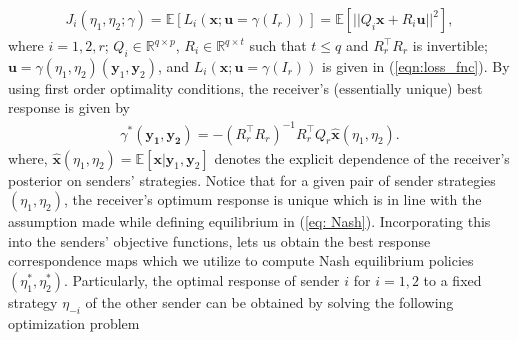 \documentclass[12pt,journal,onecolumn]{IEEEtran}
\begin{document}
\begin{align}\label{eqn:quad_cost}   J_i(\eta_1,\eta_2;\gamma)=\mathbb{E}[L_i(\boldsymbol{x};\boldsymbol{u}=\gamma(I_r))]=\mathbb{E}[||Q_i\boldsymbol{x}+R_i\boldsymbol{u}||^2],
\end{align}
where $i=1,2,r$; $Q_i\in\mathbb{R}^{q\times p}$, $R_i\in\mathbb{R}^{q\times t}$ such that $t\leq q$ and $R_r^\top R_r$ is invertible; $\boldsymbol{u}=\gamma(\eta_1,\eta_2)(\boldsymbol{y}_1, \boldsymbol{y}_2)$, and $L_i(\boldsymbol{x};\boldsymbol{u}=\gamma(I_r))$ is given in (\ref{eqn:loss_fnc}). %
By using first order optimality conditions, the receiver’s (essentially unique) best response is given by
\begin{align}\label{opt_est_receiver}
    \gamma^*(\boldsymbol{y_1},\boldsymbol{y_2})=-(R_r^\top R_r)^{-1}R_r^\top Q_r\hat{\boldsymbol{x}}(\eta_1,\eta_2).
\end{align}
where, $\boldsymbol{\hat{x}}(\eta_1,\eta_2)=\mathbb{E}[\boldsymbol{x}|\boldsymbol{y}_1,\boldsymbol{y}_2]$ denotes the explicit dependence of the receiver's posterior on senders' strategies. Notice that for a given pair of sender strategies $(\eta_1,\eta_2)$, the receiver's optimum response is unique which is in line with the assumption made while defining equilibrium in (\ref{eq: Nash}). Incorporating this into the senders' objective functions, lets us obtain %
the best response correspondence maps \cite{bacsar1998dynamic} which we utilize to compute Nash equilibrium policies $(\eta_1^*,\eta_2^*)$. Particularly, the optimal response of sender $i$ for $i=1,2$ to a fixed strategy $\eta_{-i}$ of the other sender can be obtained by solving the following optimization problem 
\end{document}
